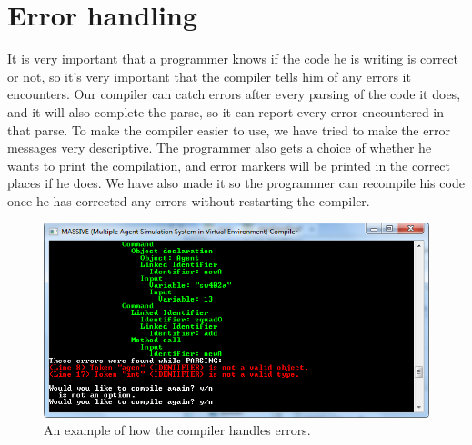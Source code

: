 \section{Error handling}
It is very important that a programmer knows if the code he is writing is correct or not, so it's very important that the compiler tells him of any errors it encounters. 
Our compiler can catch errors after every parsing of the code it does, and it will also complete the parse, so it can report every error encountered in that parse. \newline
To make the compiler easier to use, we have tried to make the error messages very descriptive. 
The programmer also gets a choice of whether he wants to print the compilation, and error markers will be printed in the correct places if he does.
We have also made it so the programmer can recompile his code once he has corrected any errors without restarting the compiler.

\begin{figure}[H]
\begin{center}
\includegraphics[scale=0.9]{Images/errorhandling.png}
\end{center}
\caption{An example of how the compiler handles errors.}
\end{figure}